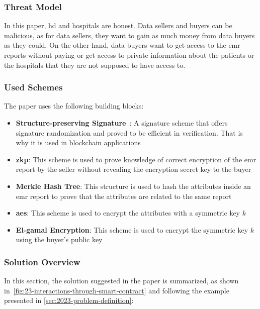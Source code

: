 \subsubsection{Threat Model}
In this paper, \ac{hd} and hospitals are honest.
Data sellers and buyers can be malicious, as for data sellers, they want to gain as much money from data buyers as they could.
On the other hand, data buyers want to get access to the \ac{emr} reports without paying or get access to private information about the patients or the hospitals that they are not supposed to have access to.

\subsubsection{Used Schemes}
The paper uses the following building blocks:

\begin{itemize}
    \item \textbf{Structure-preserving Signature}~\cite{gay2018more}: A signature scheme that offers signature randomization and proved to be efficient in verification. That is why it is used in blockchain applications
    \item \textbf{\ac{zkp}}: This scheme is used to prove knowledge of correct encryption of the \ac{emr} report by the seller without revealing the encryption secret key to the buyer
    \item \textbf{Merkle Hash Tree}: This structure is used to hash the attributes inside an \ac{emr} report to prove that the attributes are related to the same report
    \item \textbf{\ac{aes}}: This scheme is used to encrypt the attributes with a symmetric key $k$
    \item \textbf{El-gamal Encryption}: This scheme is used to encrypt the symmetric key $k$ using the buyer's public key
\end{itemize}

\subsubsection{Solution Overview}

In this section, the solution suggested in the paper is summarized, as shown in~\cref{fig:23-interactions-through-smart-contract} and following the example presented in \cref{sec:2023-problem-definition}:

